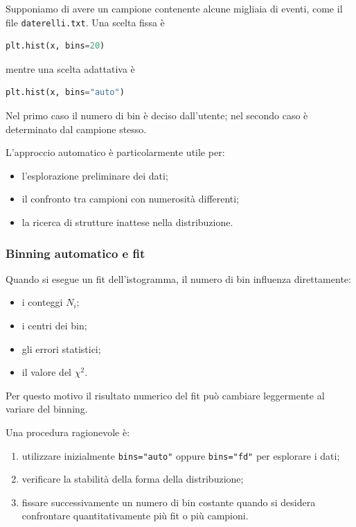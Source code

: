 \documentclass[11pt,a4paper]{book}
\begin{document}
Supponiamo di avere un campione contenente alcune migliaia di eventi,
come il file \texttt{daterelli.txt}. Una scelta fissa è

\begin{lstlisting}[language=Python]
plt.hist(x, bins=20)
\end{lstlisting}

mentre una scelta adattativa è

\begin{lstlisting}[language=Python]
plt.hist(x, bins="auto")
\end{lstlisting}

Nel primo caso il numero di bin è deciso dall'utente; nel secondo caso è
determinato dal campione stesso.

L'approccio automatico è particolarmente utile per:

\begin{itemize}
    \item l'esplorazione preliminare dei dati;
    \item il confronto tra campioni con numerosità differenti;
    \item la ricerca di strutture inattese nella distribuzione.
\end{itemize}

\subsubsection{Binning automatico e fit}

Quando si esegue un fit dell'istogramma, il numero di bin influenza
direttamente:

\begin{itemize}
    \item i conteggi $N_i$;
    \item i centri dei bin;
    \item gli errori statistici;
    \item il valore del $\chi^2$.
\end{itemize}

Per questo motivo il risultato numerico del fit può cambiare leggermente
al variare del binning.

Una procedura ragionevole è:

\begin{enumerate}
    \item utilizzare inizialmente \texttt{bins="auto"} oppure
          \texttt{bins="fd"} per esplorare i dati;
    \item verificare la stabilità della forma della distribuzione;
    \item fissare successivamente un numero di bin costante quando si
          desidera confrontare quantitativamente più fit o più campioni.
\end{enumerate}
\end{document}
